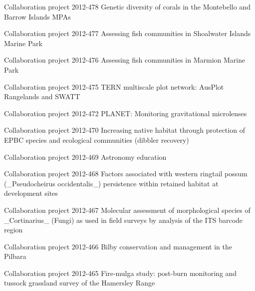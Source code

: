 \documentclass[version=last, paper=a4, DIV=18, usenames, dvipsnames]{scrartcl}
\begin{document}
\begin{longtabu}
  Collaboration project 2012-478 Genetic diversity of corals in the Montebello and Barrow Islands MPAs \newline  \\ \hline

  Collaboration project 2012-477 Assessing fish communities in Shoalwater Islands Marine Park \newline  \\ \hline

  Collaboration project 2012-476 Assessing fish communities in Marmion Marine Park \newline  \\ \hline

  Collaboration project 2012-475 TERN multiscale plot network: AusPlot Rangelands and SWATT \newline  \\ \hline

  Collaboration project 2012-472 PLANET: Monitoring gravitational microlenses \newline  \\ \hline

  Collaboration project 2012-470 Increasing native habitat through protection of EPBC species and ecological communities (dibbler recovery) \newline  \\ \hline

  Collaboration project 2012-469 Astronomy education \newline  \\ \hline

  Collaboration project 2012-468 Factors associated with western ringtail possum (\_Pseudocheirus occidentalis\_) persistence within retained habitat at development sites \newline  \\ \hline

  Collaboration project 2012-467 Molecular assessment of morphological species of \_Cortinarius\_ (Fungi) as used in field surveys by analysis of the ITS barcode region \newline  \\ \hline

  Collaboration project 2012-466 Bilby conservation and management in the Pilbara \newline  \\ \hline

  Collaboration project 2012-465 Fire-mulga study: post-burn monitoring and tussock grassland survey of the Hamersley Range \newline  \\ \hline


\end{longtabu}
\end{document}
